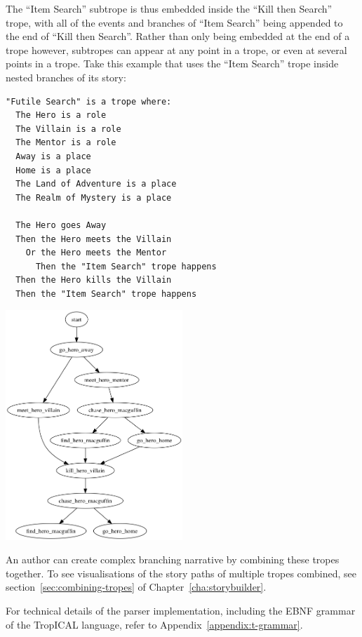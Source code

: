 \documentclass[11pt]{report}
\begin{document}
The ``Item Search'' subtrope is thus embedded inside the ``Kill then Search''
trope, with all of the events and branches of ``Item Search'' being appended to
the end of ``Kill then Search''. Rather than only being embedded at the end of a
trope however, subtropes can appear at any point in a trope, or even at several
points in a trope. Take this example that uses the ``Item Search'' trope inside
nested branches of its story:

\begin{lstlisting}[showstringspaces=false, label={lst:subtrope3}, caption={Subtrope in multiple places}]
"Futile Search" is a trope where:
  The Hero is a role
  The Villain is a role
  The Mentor is a role
  Away is a place
  Home is a place
  The Land of Adventure is a place
  The Realm of Mystery is a place

  The Hero goes Away
  Then the Hero meets the Villain
    Or the Hero meets the Mentor
      Then the "Item Search" trope happens
  Then the Hero kills the Villain
  Then the "Item Search" trope happens
\end{lstlisting}

\vspace{7mm}
\centerline{\includegraphics[width=0.5\textwidth]{subtrope3.png}}
\vspace{7mm}

An author can create complex branching narrative by combining these tropes together. To see
visualisations of the story paths of multiple tropes combined, see
section~\ref{sec:combining-tropes} of Chapter~\ref{cha:storybuilder}.

For technical details of the parser implementation, including the EBNF grammar
of the TropICAL language, refer to Appendix~\ref{appendix:t-grammar}.
\end{document}
